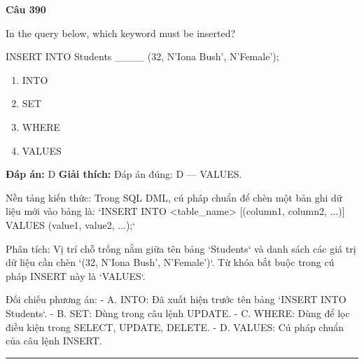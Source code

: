 \documentclass[11pt,a4paper]{article}
\newenvironment{question}[1]{%
  \par\vspace{1em}\noindent\textbf{\large Câu #1}\par\vspace{0.4em}
}{%
  \par\vspace{1em}\hrule\vspace{0.6em}
}
\newenvironment{choices}{%
  \begin{enumerate}[label=\textbf{\Alph*.},leftmargin=2.2em,itemsep=2pt,topsep=3pt]
}{%
  \end{enumerate}
}
\newcommand{\choice}{\item}
\begin{document}
\begin{question}{390}
In the query below, which keyword must be inserted?

INSERT INTO Students ____ (32, N'Iona Bush', N'Female');

\begin{choices}
\choice INTO
\choice SET
\choice WHERE
\choice VALUES
\end{choices}
\textbf{Đáp án:} D
\textbf{Giải thích:} Đáp án đúng: D — VALUES.

Nền tảng kiến thức: Trong SQL DML, cú pháp chuẩn để chèn một bản ghi dữ liệu mới vào bảng là:
`INSERT INTO <table_name> [(column1, column2, ...)] VALUES (value1, value2, ...);`

Phân tích: Vị trí chỗ trống nằm giữa tên bảng `Students` và danh sách các giá trị dữ liệu cần chèn `(32, N'Iona Bush', N'Female')`. Từ khóa bắt buộc trong cú pháp INSERT này là `VALUES`.

Đối chiếu phương án:
- A. INTO: Đã xuất hiện trước tên bảng `INSERT INTO Students`.
- B. SET: Dùng trong câu lệnh UPDATE.
- C. WHERE: Dùng để lọc điều kiện trong SELECT, UPDATE, DELETE.
- D. VALUES: Cú pháp chuẩn của câu lệnh INSERT.
\end{question}
\end{document}
